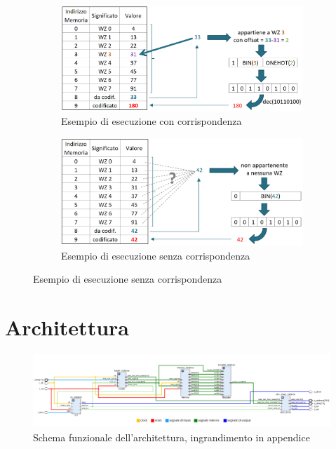 \documentclass[10pt,english, openany]{book}
\begin{document}
\begin{figure}[h!]
  \begin{subfigure}[h!]{0.5\textwidth}
    \includegraphics[width=\textwidth]{esempio_in_wz.png}
    \caption{Esempio di esecuzione con corrispondenza}
    \label{fig:1}
  \end{subfigure}
  \begin{subfigure}[h!]{0.5\textwidth}
    \includegraphics[width=\textwidth]{esempio_fuori_wz.png}
    \caption{Esempio di esecuzione senza corrispondenza}
    \label{fig:2}
  \end{subfigure}
\end{figure}

\chapter{Architettura}

\begin{figure}[h!]
    \centering
    \includegraphics[scale=0.26]{schematics.png}
    \caption{Schema funzionale dell'architettura, ingrandimento in 					appendice}
    \label{fig:schematic}
\end{figure}{}
\end{document}
